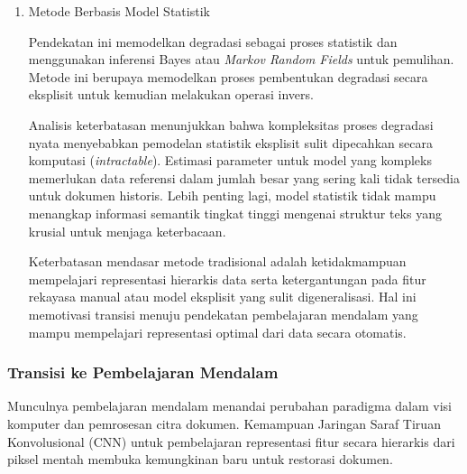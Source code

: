 \documentclass[12pt,a4paper]{article}
\begin{document}
\begin{enumerate}[leftmargin=*, labelindent=0pt, itemsep=1ex, topsep=0pt]
Selain itu, proses optimisasi untuk fungsi energi non-cembung memerlukan biaya komputasi tinggi dan sering terjebak pada minimum lokal. Kualitas hasil sangat sensitif terhadap kondisi awal dan parameter regularisasi, yang kembali memerlukan penyesuaian manual oleh ahli.

\item Metode Berbasis Model Statistik
\label{para:metode-statistik}

Pendekatan ini memodelkan degradasi sebagai proses statistik dan menggunakan inferensi Bayes atau \textit{Markov Random Fields} untuk pemulihan. Metode ini berupaya memodelkan proses pembentukan degradasi secara eksplisit untuk kemudian melakukan operasi invers.

Analisis keterbatasan menunjukkan bahwa kompleksitas proses degradasi nyata menyebabkan pemodelan statistik eksplisit sulit dipecahkan secara komputasi (\textit{intractable}). Estimasi parameter untuk model yang kompleks memerlukan data referensi dalam jumlah besar yang sering kali tidak tersedia untuk dokumen historis. Lebih penting lagi, model statistik tidak mampu menangkap informasi semantik tingkat tinggi mengenai struktur teks yang krusial untuk menjaga keterbacaan.

Keterbatasan mendasar metode tradisional adalah ketidakmampuan mempelajari representasi hierarkis data serta ketergantungan pada fitur rekayasa manual atau model eksplisit yang sulit digeneralisasi. Hal ini memotivasi transisi menuju pendekatan pembelajaran mendalam yang mampu mempelajari representasi optimal dari data secara otomatis.

\end{enumerate}

\subsubsection{Transisi ke Pembelajaran Mendalam}
\label{subsubsec:transisi-deep-learning}


Munculnya pembelajaran mendalam menandai perubahan paradigma dalam visi komputer dan pemrosesan citra dokumen. Kemampuan Jaringan Saraf Tiruan Konvolusional (CNN) untuk pembelajaran representasi fitur secara hierarkis dari piksel mentah membuka kemungkinan baru untuk restorasi dokumen.
\end{document}
